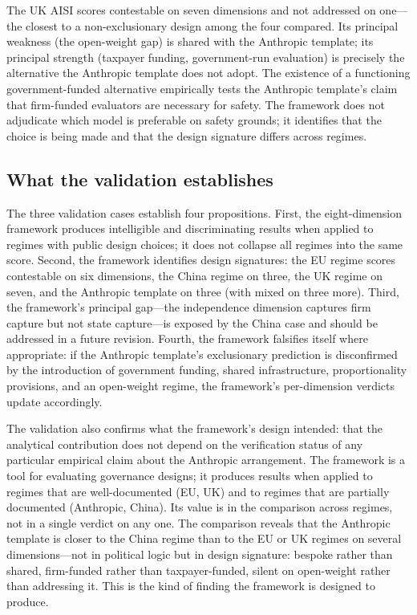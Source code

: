 The UK AISI scores contestable on seven dimensions and not addressed on one---the closest to a non-exclusionary design among the four compared. Its principal weakness (the open-weight gap) is shared with the Anthropic template; its principal strength (taxpayer funding, government-run evaluation) is precisely the alternative the Anthropic template does not adopt. The existence of a functioning government-funded alternative empirically tests the Anthropic template's claim that firm-funded evaluators are necessary for safety. The framework does not adjudicate which model is preferable on safety grounds; it identifies that the choice is being made and that the design signature differs across regimes.

\subsection{What the validation establishes}

The three validation cases establish four propositions. First, the eight-dimension framework produces intelligible and discriminating results when applied to regimes with public design choices; it does not collapse all regimes into the same score. Second, the framework identifies design signatures: the EU regime scores contestable on six dimensions, the China regime on three, the UK regime on seven, and the Anthropic template on three (with mixed on three more). Third, the framework's principal gap---the independence dimension captures firm capture but not state capture---is exposed by the China case and should be addressed in a future revision. Fourth, the framework falsifies itself where appropriate: if the Anthropic template's exclusionary prediction is disconfirmed by the introduction of government funding, shared infrastructure, proportionality provisions, and an open-weight regime, the framework's per-dimension verdicts update accordingly.

The validation also confirms what the framework's design intended: that the analytical contribution does not depend on the verification status of any particular empirical claim about the Anthropic arrangement. The framework is a tool for evaluating governance designs; it produces results when applied to regimes that are well-documented (EU, UK) and to regimes that are partially documented (Anthropic, China). Its value is in the comparison across regimes, not in a single verdict on any one. The comparison reveals that the Anthropic template is closer to the China regime than to the EU or UK regimes on several dimensions---not in political logic but in design signature: bespoke rather than shared, firm-funded rather than taxpayer-funded, silent on open-weight rather than addressing it. This is the kind of finding the framework is designed to produce.

